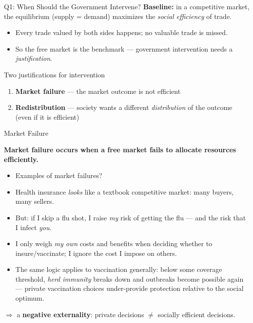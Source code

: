 \documentclass[11pt,aspectratio=169]{beamer}
\begin{document}
\begin{frame}{Q1: When Should the Government Intervene?}
  \textbf{Baseline:} in a competitive market, the equilibrium (supply = demand) maximizes the \emph{social efficiency} of trade.
  \begin{itemize}
    \item Every trade valued by both sides happens; no valuable trade is missed.
    \item So the free market is the benchmark --- government intervention needs a \emph{justification}.
  \end{itemize}
  \vspace{1em}
  \begin{alertblock}{Two justifications for intervention}
    \begin{enumerate}
      \item \textbf{Market failure} --- the market outcome is not efficient
      \item \textbf{Redistribution} --- society wants a different \emph{distribution} of the outcome (even if it is efficient)
    \end{enumerate}
  \end{alertblock}
\end{frame}

\begin{frame}{Market Failure}

\textbf{Market failure occurs when a free market fails to allocate resources efficiently.}

\begin{itemize}
	\item Examples of market failures?
\end{itemize}
 \pause
  \begin{itemize}
    \item Health insurance \emph{looks} like a textbook competitive market: many buyers, many sellers.
    \item But: if I skip a flu shot, I raise \emph{my} risk of getting the flu --- and the risk that I infect \emph{you}.
    \item I only weigh \emph{my own} costs and benefits when deciding whether to insure/vaccinate; I ignore the cost I impose on others.
    \item The same logic applies to vaccination generally: below some coverage threshold, \emph{herd immunity} breaks down and outbreaks become possible again --- private vaccination choices under-provide protection relative to the social optimum.
  \end{itemize}
  \vspace{0.5em}
  \centering
  $\Rightarrow$ a \textbf{negative externality}: private decisions $\neq$ socially efficient decisions.
\end{frame}
\end{document}
